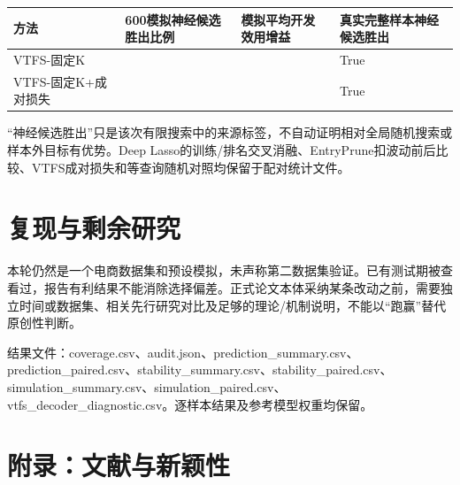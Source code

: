 \documentclass[UTF8,11pt,a4paper]{ctexart}
\begin{document}
{\def\LTcaptype{none} %
{
\footnotesize
\begin{longtable}[]{@{}
  >{\raggedright\arraybackslash}p{}
  >{\raggedright\arraybackslash}p{}
  >{\raggedright\arraybackslash}p{}
  >{\raggedright\arraybackslash}p{}@{}}
\toprule\noalign{}
\begin{minipage}[b]{\linewidth}\raggedright
方法
\end{minipage} & \begin{minipage}[b]{\linewidth}\raggedright
600模拟神经候选胜出比例
\end{minipage} & \begin{minipage}[b]{\linewidth}\raggedright
模拟平均开发效用增益
\end{minipage} & \begin{minipage}[b]{\linewidth}\raggedright
真实完整样本神经候选胜出
\end{minipage} \\
\midrule\noalign{}
\endhead
\bottomrule\noalign{}
\endlastfoot
VTFS-固定K & 0.737 & 0.023210 & True \\
VTFS-固定K+成对损失 & 0.805 & 0.027291 & True \\
\end{longtable}
}
}

``神经候选胜出''只是该次有限搜索中的来源标签，不自动证明相对全局随机搜索或样本外目标有优势。Deep Lasso的训练/排名交叉消融、EntryPrune扣波动前后比较、VTFS成对损失和等查询随机对照均保留于配对统计文件。

\section{复现与剩余研究}\label{ux590dux73b0ux4e0eux5269ux4f59ux7814ux7a76}

本轮仍然是一个电商数据集和预设模拟，未声称第二数据集验证。已有测试期被查看过，报告有利结果不能消除选择偏差。正式论文本体采纳某条改动之前，需要独立时间或数据集、相关先行研究对比及足够的理论/机制说明，不能以``跑赢''替代原创性判断。

结果文件：coverage.csv、audit.json、prediction\_summary.csv、prediction\_paired.csv、stability\_summary.csv、stability\_paired.csv、simulation\_summary.csv、simulation\_paired.csv、vtfs\_decoder\_diagnostic.csv。逐样本结果及参考模型权重均保留。

\section{附录：文献与新颖性}\label{ux9644ux5f55ux6587ux732eux4e0eux65b0ux9896ux6027}
\end{document}
